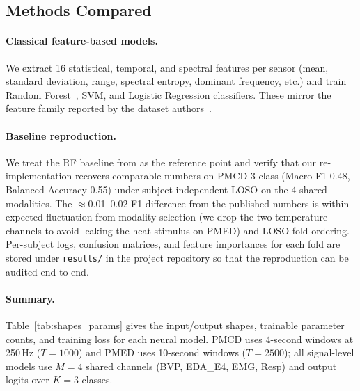 \documentclass{article}
\begin{document}
\subsection{Methods Compared}

\paragraph{Classical feature-based models.}
We extract 16 statistical, temporal, and spectral features per sensor (mean, standard deviation, range, spectral entropy, dominant frequency, etc.) and train Random Forest~\citep{breiman2001random}, SVM, and Logistic Regression classifiers. These mirror the feature family reported by the dataset authors~\citep{gouverneur2024painmonit}.

\paragraph{Baseline reproduction.}
We treat the RF baseline from \citet{gouverneur2024painmonit} as the reference point and verify that our re-implementation recovers comparable numbers on PMCD 3-class (Macro F1 0.48, Balanced Accuracy 0.55) under subject-independent LOSO on the 4 shared modalities. The $\approx$0.01--0.02 F1 difference from the published numbers is within expected fluctuation from modality selection (we drop the two temperature channels to avoid leaking the heat stimulus on PMED) and LOSO fold ordering. Per-subject logs, confusion matrices, and feature importances for each fold are stored under \texttt{results/} in the project repository so that the reproduction can be audited end-to-end.

\paragraph{Summary.}
Table~\ref{tab:shapes_params} gives the input/output shapes, trainable parameter counts, and training loss for each neural model. PMCD uses 4-second windows at 250\,Hz ($T=1000$) and PMED uses 10-second windows ($T=2500$); all signal-level models use $M=4$ shared channels (BVP, EDA\_E4, EMG, Resp) and output logits over $K=3$ classes.
\end{document}
